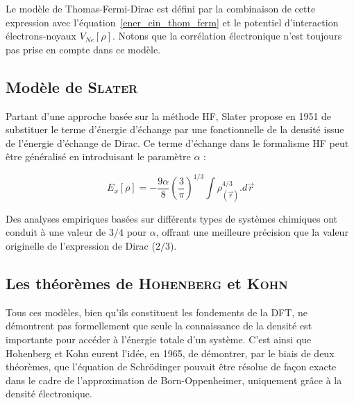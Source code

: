 	Le modèle de Thomas-Fermi-Dirac est défini par la combinaison de cette expression avec l'équation~\ref{ener_cin_thom_ferm} et le potentiel d'interaction électrons-noyaux $V_{Ne}[\rho]$. Notons que la corrélation électronique n'est toujours pas prise en compte dans ce modèle.
	
	
	\subsection{Modèle de \textsc{Slater}}
	
	Partant d'une approche basée sur la méthode HF, Slater propose en 1951 de substituer le terme d'énergie d'échange par une fonctionnelle de la densité issue de l'énergie d'échange de Dirac. Ce terme d'échange dans le formalisme HF peut être généralisé en introduisant le paramètre $\alpha$ :
	
	\begin{equation}
	E_{x}[\rho] = - \frac{9\alpha}{8} \left(\frac{3}{\pi}\right)^{1/3} \int \rho_{(\vec{r})}^{4/3} .d\vec{r}
	\end{equation}
	
	Des analyses empiriques basées sur différents types de systèmes chimiques ont conduit à une valeur de $3/4$ pour $\alpha$, offrant une meilleure précision que la valeur originelle de l'expression de Dirac ($2/3$).
	
	\subsection{Les théorèmes de \textsc{Hohenberg} et \textsc{Kohn}}
	
	Tous ces modèles, bien qu'ils constituent les fondements de la DFT, ne démontrent pas formellement que seule la connaissance de la densité est importante pour accéder à l'énergie totale d'un système. C'est ainsi que Hohenberg et Kohn eurent l'idée, en 1965, de démontrer, par le biais de deux théorèmes, que l'équation de Schr\"{o}dinger pouvait être résolue de façon exacte dans le cadre de l'approximation de Born-Oppenheimer, uniquement grâce à la densité électronique.
	
